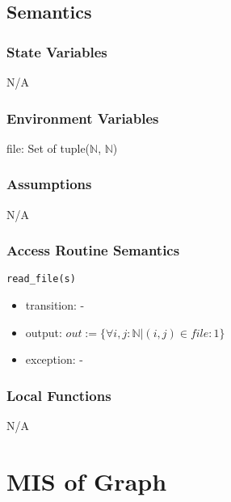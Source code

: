 \documentclass[12pt, titlepage]{article}
\begin{document}
\subsection{Semantics}

\subsubsection{State Variables}

N/A

\subsubsection{Environment Variables}

file: Set of tuple($\mathbb{N}$, $\mathbb{N}$)

\subsubsection{Assumptions}

N/A

\subsubsection{Access Routine Semantics}

\noindent \texttt{read\_file(s)}
\begin{itemize}
\item transition: - 
\item output:   $out:=\{\forall i, j:\mathbb{N}| \left(i, j\right)\in file: 1 \}$
\item exception: -  
\end{itemize}



\subsubsection{Local Functions}

N/A

\newpage

\section{MIS of Graph} \label{Module} 
\end{document}
